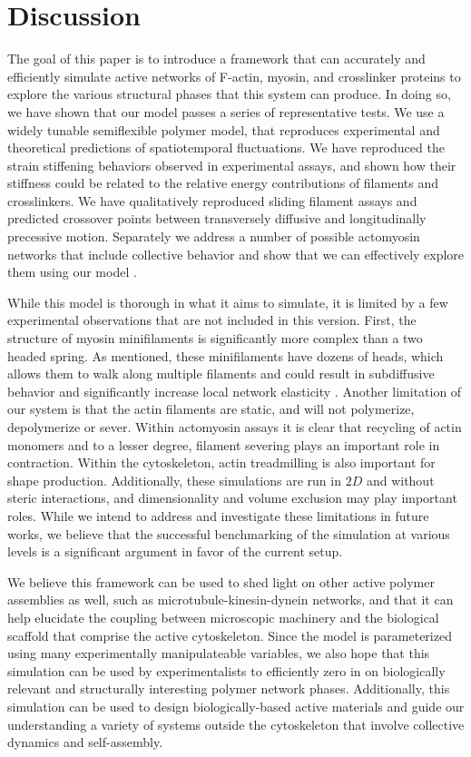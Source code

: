 \documentclass[12pt]{article}
\begin{document}
\section{Discussion}
The goal of this paper is to introduce a framework that can accurately and efficiently simulate active networks of F-actin,
myosin, and crosslinker proteins to explore the various structural phases that this system can produce. In doing so, we
have shown that our model passes a series of representative tests. We use a widely tunable semiflexible polymer model, that
reproduces experimental and theoretical predictions of spatiotemporal fluctuations. We have reproduced the strain stiffening
behaviors observed in experimental assays, and shown how their stiffness could be related to the relative energy
contributions of filaments and crosslinkers. We have qualitatively reproduced sliding filament assays and predicted
crossover points between transversely diffusive and longitudinally precessive motion. 
Separately we address a number of possible actomyosin networks that include collective behavior 
and show that we can effectively explore them using our model \cite{freedman2016,stam2016}.
\par
While this model is thorough in what it aims to simulate, it is limited by a few experimental observations that are
not included in this version. First, the structure of myosin minifilaments is significantly more complex than a two headed
spring. As mentioned, these minifilaments have dozens of heads, which allows them to walk along multiple filaments and
could result in subdiffusive behavior \cite{scholz2016} and significantly increase local network elasticity
\cite{murrellTalk}.
Another limitation of our system is that the actin filaments are static, and will not polymerize, depolymerize or
sever. Within actomyosin assays it is clear that recycling of actin monomers and to a lesser degree, filament severing 
plays an important role in contraction\cite{murrell2012}. Within the cytoskeleton, actin treadmilling is also important
for shape production. Additionally, these simulations are run in $2D$ and without steric interactions, and
dimensionality and volume exclusion may play important roles. While we intend to address and investigate these limitations in future
works, we believe that the successful benchmarking of the simulation at various levels is a significant argument in favor of the
current setup.
\par 
We believe this framework can be used to shed light on other active polymer assemblies as well,
such as microtubule-kinesin-dynein networks, and that it can help 
elucidate the coupling between microscopic machinery and the biological scaffold 
that comprise the active cytoskeleton. Since the model is parameterized using many 
experimentally manipulateable variables, we also hope that this simulation can be used
by experimentalists to efficiently zero in on biologically relevant and structurally interesting
polymer network phases. 
Additionally, this simulation can be used to design biologically-based active
materials and guide our understanding a variety of systems outside the 
cytoskeleton that involve collective dynamics and self-assembly.
\end{document}
